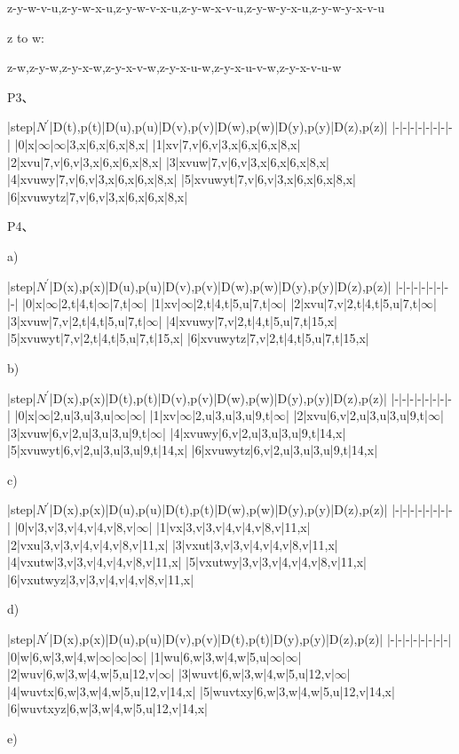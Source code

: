 \documentclass[11pt,UTF8,twoside]{article}
\begin{document}
	z-y-w-v-u,z-y-w-x-u,z-y-w-v-x-u,z-y-w-x-v-u,z-y-w-y-x-u,z-y-w-y-x-v-u
	
	z to w:
	
	z-w,z-y-w,z-y-x-w,z-y-x-v-w,z-y-x-u-w,z-y-x-u-v-w,z-y-x-v-u-w
	
	
	P3、
	
	|step|$N^{'}$|D(t),p(t)|D(u),p(u)|D(v),p(v)|D(w),p(w)|D(y),p(y)|D(z),p(z)|
	|-|-|-|-|-|-|-|-|
	|0|x|$\infty$|$\infty$|3,x|6,x|6,x|8,x|
	|1|xv|7,v|6,v|3,x|6,x|6,x|8,x|
	|2|xvu|7,v|6,v|3,x|6,x|6,x|8,x|
	|3|xvuw|7,v|6,v|3,x|6,x|6,x|8,x|
	|4|xvuwy|7,v|6,v|3,x|6,x|6,x|8,x|
	|5|xvuwyt|7,v|6,v|3,x|6,x|6,x|8,x|
	|6|xvuwytz|7,v|6,v|3,x|6,x|6,x|8,x|
	
	P4、
	
	a)
	
	|step|$N^{'}$|D(x),p(x)|D(u),p(u)|D(v),p(v)|D(w),p(w)|D(y),p(y)|D(z),p(z)|
	|-|-|-|-|-|-|-|-|
	|0|x|$\infty$|2,t|4,t|$\infty$|7,t|$\infty$|
	|1|xv|$\infty$|2,t|4,t|5,u|7,t|$\infty$|
	|2|xvu|7,v|2,t|4,t|5,u|7,t|$\infty$|
	|3|xvuw|7,v|2,t|4,t|5,u|7,t|$\infty$|
	|4|xvuwy|7,v|2,t|4,t|5,u|7,t|15,x|
	|5|xvuwyt|7,v|2,t|4,t|5,u|7,t|15,x|
	|6|xvuwytz|7,v|2,t|4,t|5,u|7,t|15,x|
	
	b)
	
	|step|$N^{'}$|D(x),p(x)|D(t),p(t)|D(v),p(v)|D(w),p(w)|D(y),p(y)|D(z),p(z)|
	|-|-|-|-|-|-|-|-|
	|0|x|$\infty$|2,u|3,u|3,u|$\infty$|$\infty$|
	|1|xv|$\infty$|2,u|3,u|3,u|9,t|$\infty$|
	|2|xvu|6,v|2,u|3,u|3,u|9,t|$\infty$|
	|3|xvuw|6,v|2,u|3,u|3,u|9,t|$\infty$|
	|4|xvuwy|6,v|2,u|3,u|3,u|9,t|14,x|
	|5|xvuwyt|6,v|2,u|3,u|3,u|9,t|14,x|
	|6|xvuwytz|6,v|2,u|3,u|3,u|9,t|14,x|
	
	c)
	
	|step|$N^{'}$|D(x),p(x)|D(u),p(u)|D(t),p(t)|D(w),p(w)|D(y),p(y)|D(z),p(z)|
	|-|-|-|-|-|-|-|-|
	|0|v|3,v|3,v|4,v|4,v|8,v|$\infty$|
	|1|vx|3,v|3,v|4,v|4,v|8,v|11,x|
	|2|vxu|3,v|3,v|4,v|4,v|8,v|11,x|
	|3|vxut|3,v|3,v|4,v|4,v|8,v|11,x|
	|4|vxutw|3,v|3,v|4,v|4,v|8,v|11,x|
	|5|vxutwy|3,v|3,v|4,v|4,v|8,v|11,x|
	|6|vxutwyz|3,v|3,v|4,v|4,v|8,v|11,x|
	
	d)
	
	|step|$N^{'}$|D(x),p(x)|D(u),p(u)|D(v),p(v)|D(t),p(t)|D(y),p(y)|D(z),p(z)|
	|-|-|-|-|-|-|-|-|
	|0|w|6,w|3,w|4,w|$\infty$|$\infty$|$\infty$|
	|1|wu|6,w|3,w|4,w|5,u|$\infty$|$\infty$|
	|2|wuv|6,w|3,w|4,w|5,u|12,v|$\infty$|
	|3|wuvt|6,w|3,w|4,w|5,u|12,v|$\infty$|
	|4|wuvtx|6,w|3,w|4,w|5,u|12,v|14,x|
	|5|wuvtxy|6,w|3,w|4,w|5,u|12,v|14,x|
	|6|wuvtxyz|6,w|3,w|4,w|5,u|12,v|14,x|
	
	e)
	
\end{document}
